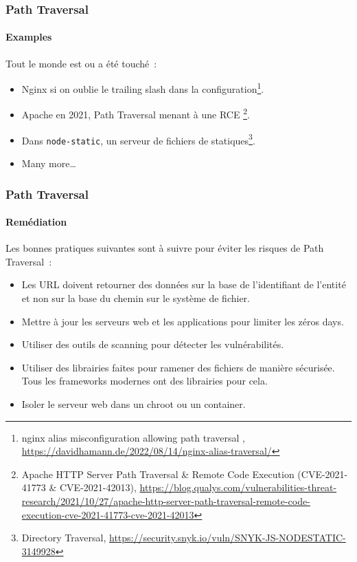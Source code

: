 \documentclass{beamer}
\begin{document}
    \begin{frame}
        \frametitle{Path Traversal}
        \framesubtitle{Examples}
        \transdissolve
        Tout le monde est ou a été touché~:
        \begin{itemize}
            \item Nginx si on oublie le trailing slash dans la configuration\footnote{nginx alias misconfiguration allowing path traversal , \url{https://davidhamann.de/2022/08/14/nginx-alias-traversal/}}.
            \item Apache en 2021, Path Traversal menant à une RCE \footnote{Apache HTTP Server Path Traversal \& Remote Code Execution (CVE-2021-41773 \& CVE-2021-42013), \url{https://blog.qualys.com/vulnerabilities-threat-research/2021/10/27/apache-http-server-path-traversal-remote-code-execution-cve-2021-41773-cve-2021-42013}}.
            \item Dans \lstinline{node-static}, un serveur de fichiers de statiques\footnote{Directory Traversal, \url{https://security.snyk.io/vuln/SNYK-JS-NODESTATIC-3149928}}.
            \item Many more\ldots
        \end{itemize}
    \end{frame}

    \begin{frame}
        \frametitle{Path Traversal}
        \framesubtitle{Remédiation}
        \transdissolve
        Les bonnes pratiques suivantes sont à suivre pour éviter les risques de Path Traversal~:
        \begin{itemize}
            \item Les URL doivent retourner des données sur la base de l'identifiant de l'entité et non sur la base du chemin sur le système de fichier.
            \item Mettre à jour les serveurs web et les applications pour limiter les zéros days.
            \item Utiliser des outils de scanning pour détecter les vulnérabilités.
            \item Utiliser des librairies faites pour ramener des fichiers de manière sécurisée.
            Tous les frameworks modernes ont des librairies pour cela.
            \item Isoler le serveur web dans un chroot ou un container.
        \end{itemize}
    \end{frame}
\end{document}
